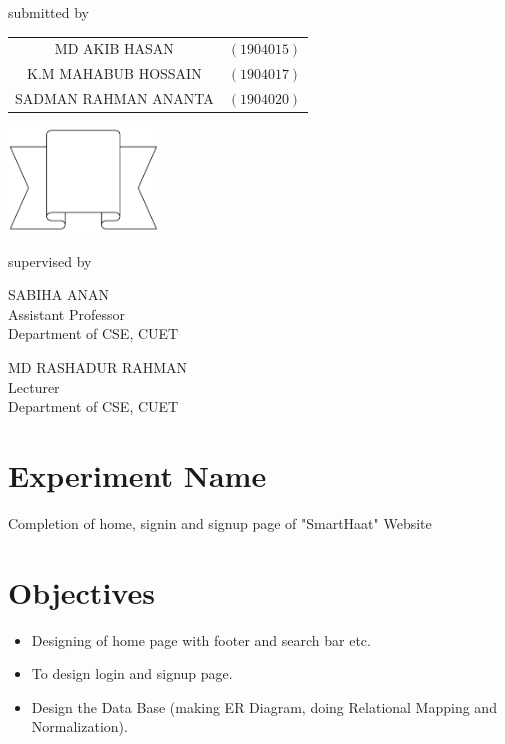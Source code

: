 \documentclass[a4paper,12pt]{report}
\begin{document}
\begin{titlepage}
	\parbox[l]{9cm}{
		\begin{center}
			submitted by
		\end{center}

		\begin{tabular}{cl}
			MD AKIB HASAN        & $(1904015)$ \\
			K.M MAHABUB HOSSAIN  & $(1904017)$ \\
			SADMAN RAHMAN ANANTA & $(1904020)$ \\
		\end{tabular}
	}
	\parbox[r]{7cm}{
		\vspace{1cm}
		\begin{center}
			\includegraphics[width=4cm, keepaspectratio]{remarks.png}
		\end{center}
	}

	\vspace{0.5cm}
	supervised by

	\parbox[l]{8cm}{\begin{center}

			SABIHA ANAN\\
\footnotesize{Assistant Professor\\
				Department of CSE, CUET}
		\end{center}
	}
	\parbox[r]{8cm}{\begin{center}

			MD RASHADUR RAHMAN\\
\footnotesize{Lecturer \\
				Department of CSE, CUET}
		\end{center}
	}

	\vfill
\end{titlepage}


\onehalfspacing

\section*{Experiment Name}
Completion of home, signin and signup page  of "SmartHaat" Website
\section*{Objectives}
\begin{itemize}
	\item Designing of home page with footer and search bar etc.
	\item To design login and signup page.
	\item Design the Data Base (making ER Diagram, doing Relational Mapping and Normalization).
\end{itemize}
\end{document}
